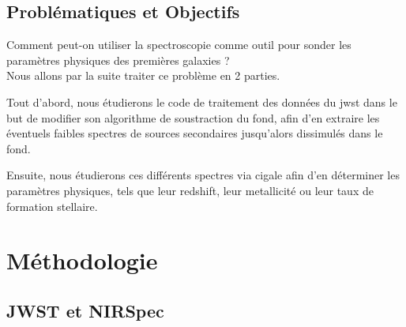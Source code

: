 \documentclass[12pt, a4paper]{article}
\begin{document}
\subsection{Problématiques et Objectifs}

Comment peut-on utiliser la spectroscopie comme outil pour sonder les paramètres physiques des premières galaxies ?\\

Nous allons par la suite traiter ce problème en 2 parties.

Tout d'abord, nous étudierons le code de traitement des données du \gls{jwst} dans le but de modifier son algorithme de soustraction du fond, afin d'en extraire les éventuels faibles spectres de sources secondaires jusqu'alors dissimulés dans le fond.

Ensuite, nous étudierons ces différents spectres via \gls{cigale} afin d'en déterminer les paramètres physiques, tels que leur redshift, leur metallicité ou leur taux de formation stellaire.

\section{Méthodologie}

\subsection{JWST et NIRSpec}
\end{document}
